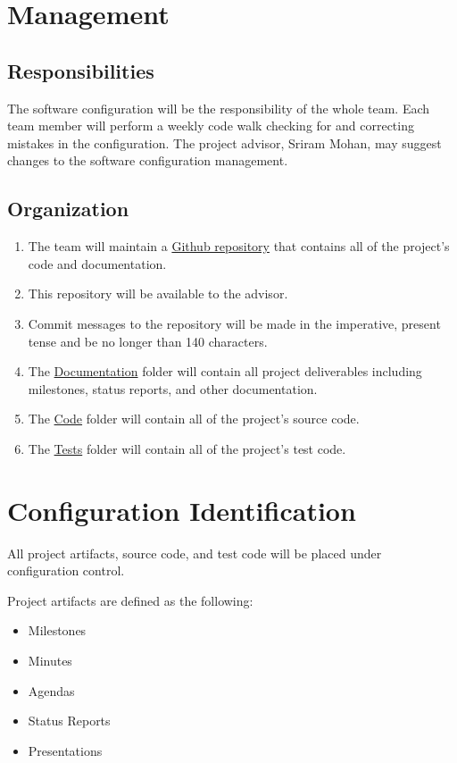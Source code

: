 \documentclass[12pt]{article}
\begin{document}
\section{Management}
\subsection{Responsibilities}
The software configuration will be the responsibility of the whole team. Each team member will perform a weekly code walk checking for and correcting mistakes in the configuration. The project advisor, Sriram Mohan, may suggest changes to the software configuration management.

\subsection{Organization}
\begin{enumerate}
\item The team will maintain a \href{https://github.com/mooremo/Settlers-of-Catan}{Github repository} that contains all of the project's code and documentation.
\item This repository will be available to the advisor.
\item Commit messages to the repository will be made in the imperative, present tense and be no longer than 140 characters.
\item The \href{https://github.com/mooremo/Settlers-of-Catan/tree/master/Documentation}{Documentation} folder will contain all project deliverables including milestones, status reports, and other documentation.
\item The \href{https://github.com/mooremo/Settlers-of-Catan/tree/master/Code}{Code} folder will contain all of the project's source code.
\item The \href{https://github.com/mooremo/Settlers-of-Catan/tree/master/Code/Tests}{Tests} folder will contain all of the project's test code.
\end{enumerate}

\section{Configuration Identification}
All project artifacts, source code, and test code will be placed under configuration control. 

Project artifacts are defined as the following:
\begin{itemize}
\item Milestones
\item Minutes
\item Agendas
\item Status Reports
\item Presentations
\end{itemize}
\end{document}
